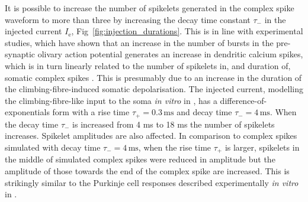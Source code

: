 \documentclass[utf8]{frontiersSCNS} %
\newcommand{\mse}{\,\mathrm{ms}}
\renewcommand{\k}{\mathrm{K}}
\newcommand{\na}{\mathrm{Na}}
\newcommand{\leak}{\mathrm{l}}
\begin{document}

It is possible to increase the number of spikelets generated in the
complex spike waveform to more than three by increasing the decay time
constant $\tau_-$ in the injected current $I_{\mathrm{e}}$,
Fig~\ref{fig:injection_durations}. This is in line with experimental
studies, which have shown that an increase in the number of bursts in
the pre-synaptic olivary action potential generates an increase in
dendritic calcium spikes, which is in turn linearly related to the
number of spikelets in, and duration of, somatic complex spikes
\cite{MathyEtAl2009}. This is presumably due to an increase in the
duration of the climbing-fibre-induced somatic depolarisation.  The
injected current, modelling the climbing-fibre-like input to the soma
\textsl{in vitro} in \cite{DavieEtAl2008}, has a
difference-of-exponentials form with a rise time $\tau_+=0.3\mse$ and
decay time $\tau_-=4\mse$. When the decay time $\tau_-$ is increased
from 4 ms to 18 ms the number of spikelets increases. Spikelet
amplitudes are also affected. In comparison to complex spikes
simulated with decay time $\tau_- = 4\mse$, when the rise time
$\tau_+$ is larger, spikelets in the middle of simulated complex
spikes were reduced in amplitude but the amplitude of those towards
the end of the complex spike are increased.  This is strikingly
similar to the Purkinje cell responses described experimentally
\textsl{in vitro} in \cite{MonsivaisEtAl2005}.

\end{document}
